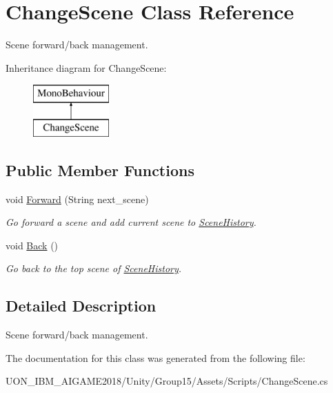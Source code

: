 \hypertarget{class_change_scene}{}\section{Change\+Scene Class Reference}
\label{class_change_scene}


Scene forward/back management.  


Inheritance diagram for Change\+Scene\+:\begin{figure}[H]
\begin{center}
\leavevmode
\includegraphics[height=2.000000cm]{class_change_scene}
\end{center}
\end{figure}
\subsection*{Public Member Functions}
\begin{DoxyCompactItemize}
\item 
\mbox{\label{class_change_scene_a9451a67ccf1d11d95d4dd515c173d96e}} 
void \mbox{\hyperlink{class_change_scene_a9451a67ccf1d11d95d4dd515c173d96e}{Forward}} (String next\+\_\+scene)
\begin{DoxyCompactList}\small\item\em Go forward a scene and add current scene to \mbox{\hyperlink{class_scene_history}{Scene\+History}}. \end{DoxyCompactList}\item 
\mbox{\label{class_change_scene_ae93550fcbb1587005d4799278ea4b415}} 
void \mbox{\hyperlink{class_change_scene_ae93550fcbb1587005d4799278ea4b415}{Back}} ()
\begin{DoxyCompactList}\small\item\em Go back to the top scene of \mbox{\hyperlink{class_scene_history}{Scene\+History}}. \end{DoxyCompactList}\end{DoxyCompactItemize}


\subsection{Detailed Description}
Scene forward/back management. 

The documentation for this class was generated from the following file\+:\begin{DoxyCompactItemize}
\item 
U\+O\+N\+\_\+\+I\+B\+M\+\_\+\+A\+I\+G\+A\+M\+E2018/\+Unity/\+Group15/\+Assets/\+Scripts/Change\+Scene.\+cs\end{DoxyCompactItemize}
